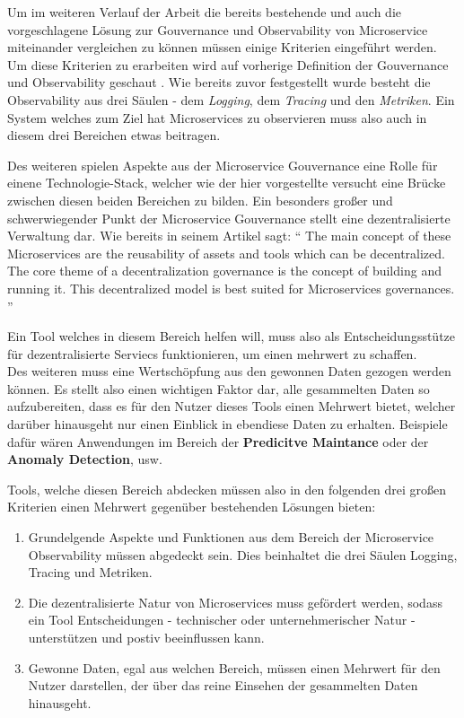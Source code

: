 \documentclass[
	12pt,
	BCOR=5mm,
	DIV=12,
	headinclude=on,
	footinclude=off,
	parskip=half,
	bibliography=totoc,
	listof=entryprefix,
	toc=listof,
	numbers=noenddot,
	plainfootsepline
]{scrreprt}
\begin{document}
Um im weiteren Verlauf der Arbeit die bereits bestehende und auch die vorgeschlagene Lösung zur Gouvernance und Observability von Microservice miteinander vergleichen zu können müssen einige Kriterien eingeführt werden. Um diese Kriterien zu erarbeiten wird auf vorherige Definition der Gouvernance und Observability geschaut . Wie bereits zuvor festgestellt wurde besteht die Observability aus drei Säulen - dem \textit{Logging}, dem \textit{Tracing} und den \textit{Metriken}. Ein System welches zum Ziel hat Microservices zu observieren muss also auch in diesem drei Bereichen etwas beitragen. 

Des weiteren spielen Aspekte aus der Microservice Gouvernance eine Rolle für einene Technologie-Stack, welcher wie der hier vorgestellte versucht eine Brücke zwischen diesen beiden Bereichen zu bilden. Ein besonders großer und schwerwiegender Punkt der Microservice Gouvernance stellt eine dezentralisierte Verwaltung dar. Wie bereits \citeauthor{LeanixGouv} in seinem Artikel sagt:
\enquote{
	The main concept of these Microservices are the reusability of assets and tools which can be decentralized. The core theme of a decentralization governance is the concept of building and running it. This decentralized model is best suited for Microservices governances.
}\autocite{LeanixGouv}

Ein Tool welches in diesem Bereich helfen will, muss also als Entscheidungsstütze für dezentralisierte Serviecs funktionieren, um einen mehrwert zu schaffen. \\
Des weiteren muss eine Wertschöpfung aus den gewonnen Daten gezogen werden können. Es stellt also einen wichtigen Faktor dar, alle gesammelten Daten so aufzubereiten, dass es für den Nutzer dieses Tools einen Mehrwert bietet, welcher darüber hinausgeht nur einen Einblick in ebendiese Daten zu erhalten. Beispiele dafür wären Anwendungen im Bereich der \textbf{Predicitve Maintance} oder der \textbf{Anomaly Detection}, usw.

Tools, welche diesen Bereich abdecken müssen also in den folgenden drei großen Kriterien einen Mehrwert gegenüber bestehenden Lösungen bieten:

\begin{enumerate}
	\item Grundelgende Aspekte und Funktionen aus dem Bereich der Microservice Observability müssen abgedeckt sein. Dies beinhaltet die drei Säulen Logging, Tracing und Metriken.
	\item Die dezentralisierte Natur von Microservices muss gefördert werden, sodass ein Tool Entscheidungen - technischer oder unternehmerischer Natur - unterstützen und postiv beeinflussen kann.
	\item Gewonne Daten, egal aus welchen Bereich, müssen einen Mehrwert für den Nutzer darstellen, der über das reine Einsehen der gesammelten Daten hinausgeht.
\end{enumerate}
\end{document}

